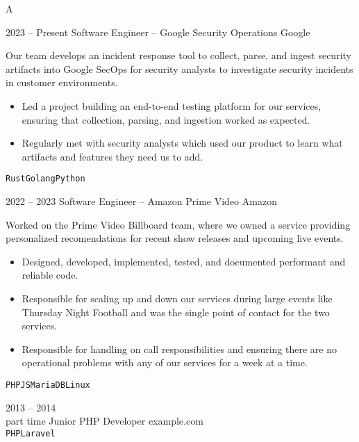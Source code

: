 \documentclass[9pt]{developercv} %
\begin{document}
\vspace{0.5cm} %



A


\begin{entrylist}
  \entry
  {2023 -- Present}
  {Software Engineer -- Google Security Operations}
  {Google}
  {

    Our team develops an incident response tool to collect,
    parse, and ingest security artifacts into Google SecOps for security
    analysts to investigate security incidents in customer environments.

    \begin{itemize}[leftmargin=\parindent, leftmargin=*]

      \item
        Led a project building an end-to-end testing platform for our services,
        ensuring that collection, parsing, and ingestion worked as
        expected.
      \item
        Regularly met with security analysts which used our product to learn
        what artifacts and features they need us to add.
    \end{itemize}

  \texttt{Rust}\slashsep\texttt{Golang}\slashsep\texttt{Python}}
  \entry
  {2022 -- 2023}
  {Software Engineer -- Amazon Prime Video}
  {Amazon}
  {
    Worked on the Prime Video Billboard team, where we owned a service
    providing personalized recomendations for recent show releases and upcoming
    live events.

    \begin{itemize}[leftmargin=\parindent, leftmargin=*]
      \item Designed, developed, implemented, tested, and documented
        performant and reliable code.
      \item Responsible for scaling up and down our services during
        large events like Thursday Night Football and was the single
        point of contact for the two services.
      \item Responsible for handling on call responsibilities and
        ensuring there are no operational problems with any of our
        services for a week at a time.
    \end{itemize}

  \texttt{PHP}\slashsep\texttt{JS}\slashsep\texttt{MariaDB}\slashsep\texttt{Linux}}
  \entry
  {2013 -- 2014\\\footnotesize{part time}}
  {Junior PHP Developer}
  {example.com}
  {\lorem\lorem\\ \texttt{PHP}\slashsep\texttt{Laravel}}
\end{entrylist}
\end{document}
